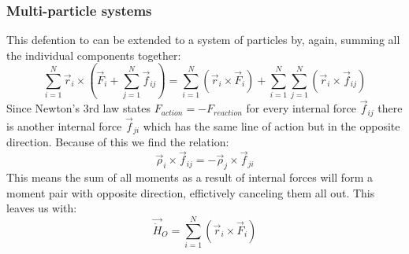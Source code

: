 \documentclass[11pt, a4paper]{article}
\numberwithin{equation}{section}
\numberwithin{figure}{section}
\begin{document}
\subsubsection{Multi-particle systems}
This defention to can be extended to a system of particles by, again, summing all the individual components together:
\begin{equation}
  \sum_{i=1}^N \vec{r}_i \times (\vec{F}_i + \sum_{j=1}^N \vec{f}_{ij}) = \sum_{i=1}^N ( \vec{r}_i \times \vec{F}_i ) + \sum_{i=1}^N \sum_{j=1}^N (\vec{r}_i \times \vec{f}_{ij}) 
\end{equation}
Since Newton's 3rd law states $F_{action} = -F_{reaction}$ for every internal force $\vec{f}_{ij}$ there is another internal force $\vec{f}_{ji}$ which has the same line of action but in the opposite direction. Because of this we find the relation:
\begin{equation}
  \vec{\rho}_i \times \vec{f}_{ij} = -\vec{\rho}_j \times \vec{f}_{ji}
\end{equation}
This means the sum of all moments as a result of internal forces will form a moment pair with opposite direction, effictively canceling them all out. This leaves us with:
\begin{equation}
  \vec{\dot{H}}_O = \sum_{i=1}^N (\vec{r}_i \times \vec{F}_i)
\end{equation}
\end{document}
